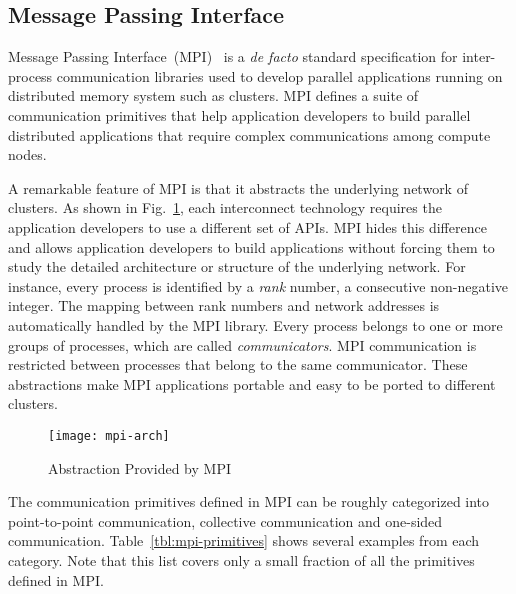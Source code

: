 \subsection{Message Passing Interface}\label{sec:i-mpi}

Message Passing Interface~(MPI)~\autocite{MessagePassingInterfaceForum2015} is
a \emph{de facto} standard specification for inter-process communication
libraries used to develop parallel applications running on distributed memory
system such as clusters. MPI defines a suite of communication primitives that
help application developers to build parallel distributed applications that
require complex communications among compute nodes.

A remarkable feature of MPI is that it abstracts the underlying network
of clusters. As shown in Fig.~\ref{fig:mpi-arch}, each interconnect technology
requires the application developers to use a different set of APIs. MPI hides
this difference and allows application developers to build applications
without forcing them to study the detailed architecture or structure of the
underlying network. For instance, every process is identified by a \emph{rank}
number, a consecutive non-negative integer. The mapping between rank numbers
and network addresses is automatically handled by the MPI library. Every
process belongs to one or more groups of processes, which are called
\emph{communicators}. MPI communication is restricted between processes that
belong to the same communicator. These abstractions make MPI applications
portable and easy to be ported to different clusters.

\begin{figure}
    \centering
    \texttt{[image: mpi-arch]}
    \caption{Abstraction Provided by MPI}%
    \label{fig:mpi-arch}
\end{figure}

The communication primitives defined in MPI can be roughly categorized into
point-to-point communication, collective communication and one-sided
communication. Table~\ref{tbl:mpi-primitives} shows several examples from each
category. Note that this list covers only a small fraction of all the
primitives defined in MPI\@.

